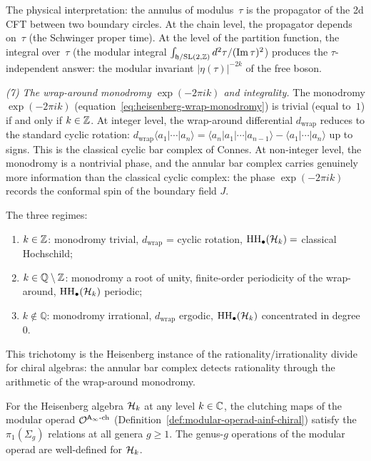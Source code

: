 \begin{computation}
The physical interpretation:
the annulus of modulus~$\tau$ is the propagator of
the 2d CFT between two boundary circles. At the chain
level, the propagator depends on~$\tau$
(the Schwinger proper time). At the level of the
partition function, the integral over~$\tau$
(the modular integral $\int_{\mathfrak{h}/\mathrm{SL}(2,\mathbb{Z})}
d^2\tau / (\mathrm{Im}\,\tau)^2$)
produces the $\tau$-independent answer: the modular
invariant $|\eta(\tau)|^{-2k}$ of the free boson.

\smallskip
\noindent
\emph{(7) The wrap-around monodromy $\exp(-2\pi ik)$ and integrality.}
The monodromy $\exp(-2\pi ik)$
(equation~\eqref{eq:heisenberg-wrap-monodromy})
is trivial (equal to~$1$) if and only if $k \in \mathbb{Z}$.
At integer level, the wrap-around differential
$d_{\mathrm{wrap}}$ reduces to the standard cyclic
rotation: $d_{\mathrm{wrap}}\langle a_1|\cdots|a_n\rangle
= \langle a_n|a_1|\cdots|a_{n-1}\rangle
- \langle a_1|\cdots|a_n\rangle$
up to signs. This is the classical cyclic bar
complex of Connes. At non-integer level, the monodromy
is a nontrivial phase, and the annular bar complex
carries genuinely more information than the
classical cyclic complex: the phase
$\exp(-2\pi ik)$ records the conformal spin of the
boundary field $J$.

The three regimes:
\begin{enumerate}[label=\textup{(\roman*)}]
\item $k \in \mathbb{Z}$: monodromy trivial,
 $d_{\mathrm{wrap}}$ = cyclic rotation,
 $\operatorname{HH}_\bullet(\mathcal{H}_k) = $ classical Hochschild;
\item $k \in \mathbb{Q} \setminus \mathbb{Z}$: monodromy a
 root of unity, finite-order periodicity of the
 wrap-around, $\operatorname{HH}_\bullet(\mathcal{H}_k)$ periodic;
\item $k \notin \mathbb{Q}$: monodromy irrational,
 $d_{\mathrm{wrap}}$ ergodic,
 $\operatorname{HH}_\bullet(\mathcal{H}_k)$ concentrated in degree~$0$.
\end{enumerate}
This trichotomy is the Heisenberg instance of the
rationality/irrationality divide for chiral algebras:
the annular bar complex detects rationality through
the arithmetic of the wrap-around monodromy.
\end{computation}

\begin{proposition}
\label{prop:heisenberg-modular-operad-welldefined}
For the Heisenberg algebra $\mathcal{H}_k$ at any level
$k \in \mathbb{C}$, the clutching maps of the modular operad
$\mathcal{O}^{\mathsf{A}_{\infty}\text{-ch}}$
\textup{(}Definition~\textup{\ref{def:modular-operad-ainf-chiral}}\textup{)}
satisfy the $\pi_1(\Sigma_g)$ relations at all genera $g \ge 1$.
The genus-$g$ operations of the modular operad are
well-defined for $\mathcal{H}_k$.
\end{proposition}

